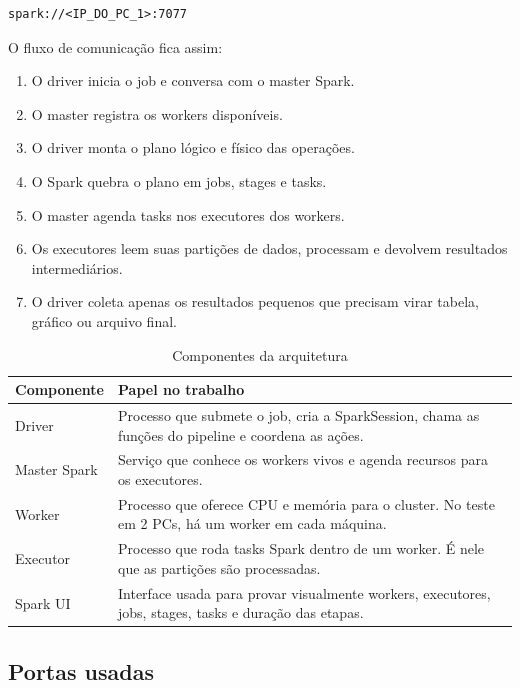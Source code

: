 \documentclass[12pt,a4paper]{article}
\begin{document}
\begin{lstlisting}
spark://<IP_DO_PC_1>:7077
\end{lstlisting}

O fluxo de comunicação fica assim:

\begin{enumerate}
    \item O driver inicia o job e conversa com o master Spark.
    \item O master registra os workers disponíveis.
    \item O driver monta o plano lógico e físico das operações.
    \item O Spark quebra o plano em jobs, stages e tasks.
    \item O master agenda tasks nos executores dos workers.
    \item Os executores leem suas partições de dados, processam e devolvem resultados intermediários.
    \item O driver coleta apenas os resultados pequenos que precisam virar tabela, gráfico ou arquivo final.
\end{enumerate}

\begin{table}[H]
\centering
\caption{Componentes da arquitetura}
\begin{tabular}{p{}p{}}
\toprule
Componente & Papel no trabalho \\
\midrule
Driver & Processo que submete o job, cria a SparkSession, chama as funções do pipeline e coordena as ações. \\
Master Spark & Serviço que conhece os workers vivos e agenda recursos para os executores. \\
Worker & Processo que oferece CPU e memória para o cluster. No teste em 2 PCs, há um worker em cada máquina. \\
Executor & Processo que roda tasks Spark dentro de um worker. É nele que as partições são processadas. \\
Spark UI & Interface usada para provar visualmente workers, executores, jobs, stages, tasks e duração das etapas. \\
\bottomrule
\end{tabular}
\end{table}

\subsection{Portas usadas}
\end{document}
